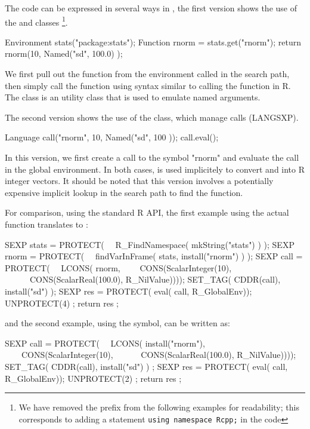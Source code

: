 The code can be expressed in several ways in , the first version
shows the use of the  and  classes
\footnote{We have removed the  prefix from the following
  examples for readability; this corresponds to adding a statement
  \texttt{using namespace Rcpp;} in the code}.

\begin{example}
Environment stats("package:stats");
Function rnorm = stats.get("rnorm");
return rnorm(10, Named("sd", 100.0) );
\end{example}

We first pull out the  function from the environment 
called  in the search path, then simply call the function 
using syntax similar to calling the function in R. The  
class is an utility class that is used to emulate named arguments.

The second version shows the use of the  class, which 
manage calls (LANGSXP). 

\begin{example}
Language call("rnorm", 10, Named("sd", 100 ));
call.eval();
\end{example}

In this version, we first create a call to the symbol "rnorm" and
evaluate the call in the global environment. In both cases, 
is used implicitely to convert  and  
into R integer vectors. It should be noted that this 
version involves a potentially expensive implicit lookup in the search path
to find the  function. 

For comparison, using the standard R API, the first example using the actual  function
translates to :

\begin{example}
SEXP stats = PROTECT( 
\ \ R_FindNamespace( mkString("stats") ) );
SEXP rnorm = PROTECT( 
\ \ findVarInFrame( stats, install("rnorm") ) );
SEXP call  = PROTECT( 
\ \ LCONS( rnorm, 
\ \ \ \ CONS(ScalarInteger(10), 
\ \ \ \ \ \ CONS(ScalarReal(100.0), R_NilValue))));
SET_TAG( CDDR(call), install("sd") );
SEXP res = PROTECT( eval( call, R_GlobalEnv));
UNPROTECT(4) ;
return res ;
\end{example}

and the second example, using the  symbol, can be written as:

\begin{example}
SEXP call  = PROTECT( 
\ \ LCONS( install("rnorm"), 
\ \ \ \ CONS(ScalarInteger(10), 
\ \ \ \ \ \ CONS(ScalarReal(100.0), R_NilValue))));
SET_TAG( CDDR(call), install("sd") ) ;
SEXP res = PROTECT( eval( call, R_GlobalEnv));
UNPROTECT(2) ;
return res ;
\end{example}

